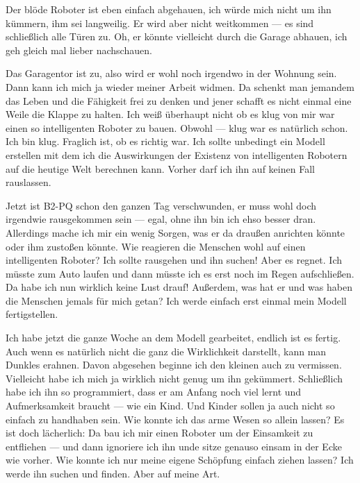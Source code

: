 Der blöde Roboter ist eben einfach abgehauen, ich würde mich nicht um ihn kümmern, ihm sei langweilig. Er wird aber nicht weitkommen — es sind schließlich alle Türen zu. Oh, er könnte vielleicht durch die Garage abhauen, ich geh gleich mal lieber nachschauen.
 
Das Garagentor ist zu, also wird er wohl noch irgendwo in der Wohnung sein. Dann kann ich mich ja wieder meiner Arbeit widmen. Da schenkt man jemandem das Leben und die Fähigkeit frei zu denken und jener schafft es nicht einmal eine Weile die Klappe zu halten. Ich weiß überhaupt nicht ob es klug von mir war einen so intelligenten Roboter zu bauen. Obwohl — klug war es natürlich schon. Ich bin klug. Fraglich ist, ob es richtig war. Ich sollte unbedingt ein Modell erstellen mit dem ich die Auswirkungen der Existenz von intelligenten Robotern auf die heutige Welt berechnen kann. Vorher darf ich ihn auf keinen Fall rauslassen. %

Jetzt ist B2-PQ schon den ganzen Tag verschwunden, er muss wohl doch irgendwie rausgekommen sein — egal, ohne ihn bin ich ehso besser dran. Allerdings mache ich mir ein wenig Sorgen, was er da draußen anrichten könnte oder ihm zustoßen könnte. Wie reagieren die Menschen wohl auf einen intelligenten Roboter? Ich sollte rausgehen und ihn suchen! Aber es regnet. Ich müsste zum Auto laufen und dann müsste ich es erst noch im Regen aufschließen. Da habe ich nun wirklich keine Lust drauf! Außerdem, was hat er und was haben die Menschen jemals für mich getan? Ich werde einfach erst einmal mein Modell fertigstellen.

Ich habe jetzt die ganze Woche an dem Modell gearbeitet, endlich ist es fertig. Auch wenn es natürlich nicht die ganz die Wirklichkeit darstellt, kann man Dunkles erahnen. Davon abgesehen beginne ich den kleinen auch zu vermissen. Vielleicht habe ich mich ja wirklich nicht genug um ihn gekümmert. Schließlich habe ich ihn so programmiert, dass er am Anfang noch viel lernt und Aufmerksamkeit braucht — wie ein Kind. Und Kinder sollen ja auch nicht so einfach zu handhaben sein. Wie konnte ich das arme Wesen so allein lassen? Es ist doch lächerlich: Da bau ich mir einen Roboter um der Einsamkeit zu entfliehen — und dann ignoriere ich ihn unde sitze genauso einsam in der Ecke wie vorher. Wie konnte ich nur meine eigene Schöpfung einfach ziehen lassen? Ich werde ihn suchen und finden. Aber auf meine Art.


